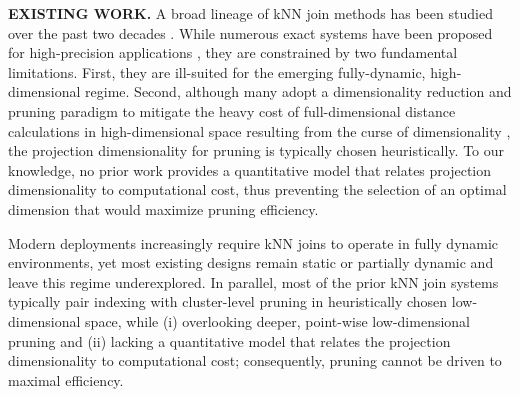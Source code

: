 \noindent\textbf{EXISTING WORK.} A broad lineage of kNN join methods has been studied over the past two decades \cite{gao2023high, gu2018approximate, sun2014srs, zhao2023towards, andoni2008near, li2019approximate, cui2005exploring, bohm2004k, xia2004gorder, yu2007efficient, yu2001indexing, bohm2006efficiently, yu2010high, cui2003contorting}. While numerous exact systems have been proposed for high-precision applications \cite{bohm2004k, xia2004gorder, yu2007efficient, yu2001indexing, bohm2006efficiently, yu2010high, cui2003contorting, yang2014continuous, ukey2022efficient, ukey2023efficient, ukey2024cluster}, they are constrained by two fundamental limitations. First, they are ill-suited for the emerging fully-dynamic, high-dimensional regime. Second, although many adopt a dimensionality reduction and pruning paradigm to mitigate the heavy cost of full-dimensional distance calculations in high-dimensional space resulting from the curse of dimensionality \cite{altman2018curse}, the projection dimensionality for pruning is typically chosen heuristically. To our knowledge, no prior work provides a quantitative model that relates projection dimensionality to computational cost, thus preventing the selection of an optimal dimension that would maximize pruning efficiency.


%
Modern deployments increasingly require kNN joins to operate in fully dynamic environments, yet most existing designs remain static or partially dynamic and leave this regime underexplored. In parallel, most of the prior kNN join systems typically pair indexing with cluster-level pruning in heuristically chosen low-dimensional space, while (i) overlooking deeper, point-wise low-dimensional pruning and (ii) lacking a quantitative model that relates the projection dimensionality to computational cost; consequently, pruning cannot be driven to maximal efficiency.

